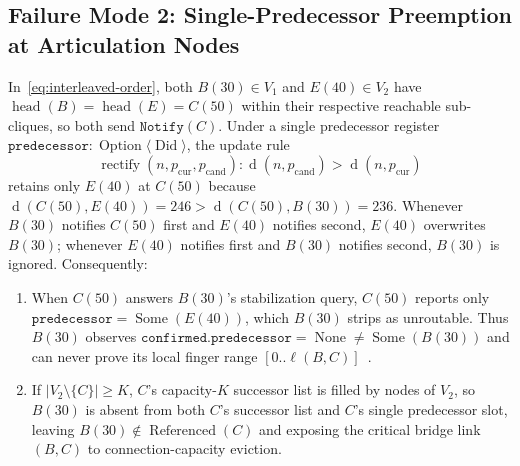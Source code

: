 \documentclass[journal]{IEEEtran}
\newcommand{\dist}{\operatorname{d}}
\newcommand{\Head}{\operatorname{head}}
\newcommand{\Referenced}{\operatorname{Referenced}}
\begin{document}
\subsection{Failure Mode 2: Single-Predecessor Preemption at Articulation Nodes}
In~\eqref{eq:interleaved-order}, both $B(30) \in V_1$ and $E(40) \in V_2$ have
$\Head(B) = \Head(E) = C(50)$ within their respective reachable sub-cliques, so
both send $\texttt{Notify}(C)$. Under a single predecessor register
$\texttt{predecessor}: \operatorname{Option}\langle\operatorname{Did}\rangle$,
the update rule
\[
  \operatorname{rectify}(n, p_{\text{cur}}, p_{\text{cand}}) :
  \dist(n, p_{\text{cand}}) > \dist(n, p_{\text{cur}})
\]
retains only $E(40)$ at $C(50)$ because $\dist(C(50), E(40)) = 246 >
\dist(C(50), B(30)) = 236$. Whenever $B(30)$ notifies $C(50)$ first and $E(40)$
notifies second, $E(40)$ overwrites $B(30)$; whenever $E(40)$ notifies first and
$B(30)$ notifies second, $B(30)$ is ignored. Consequently:
\begin{enumerate}
  \item When $C(50)$ answers $B(30)$'s stabilization query, $C(50)$ reports only
  $\texttt{predecessor} = \operatorname{Some}(E(40))$, which $B(30)$ strips as
  unroutable. Thus $B(30)$ observes $\texttt{confirmed.predecessor} =
  \operatorname{None} \neq \operatorname{Some}(B(30))$ and can never prove its
  local finger range $[0..\ell(B, C)]$~\cite{Zave2017}.
  \item If $|V_2 \setminus \{C\}| \ge K$, $C$'s capacity-$K$ successor list is
  filled by nodes of $V_2$, so $B(30)$ is absent from both $C$'s successor list
  and $C$'s single predecessor slot, leaving $B(30) \notin \Referenced(C)$ and
  exposing the critical bridge link $(B, C)$ to connection-capacity eviction.
\end{enumerate}
\end{document}
